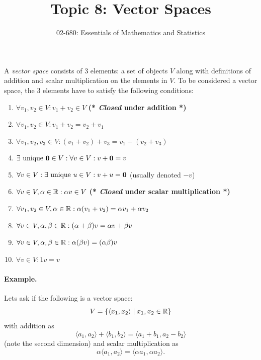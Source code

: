 


\title{Topic 8: Vector Spaces}
\author{02-680: Essentials of Mathematics and Statistics}


\maketitle

A \emph{vector space} consists of 3 elements: 
a set of objects $V$ along with definitions of addition and scalar multiplication on the elements in $V$. 
To be considered a vector space, the 3 elements have to satisfy the following conditions: 
\begin{enumerate}
\item $\forall v_1,v_2 \in V : v_1+v_2 \in V$ \textbf{(* \emph{Closed} under addition *)}
\item $\forall v_1,v_2 \in V : v_1 + v_2 = v_2 + v_1$
\item $\forall v_1,v_2,v_3 \in V : (v_1 + v_2) + v_3 = v_1 + (v_2 + v_3)$
\item $\exists \textnormal{ unique }\mathbf{0} \in V : \forall v \in V : v + \mathbf{0} = v$ 
\item $\forall v \in V : \exists \textnormal{ unique }u \in V : v + u = \mathbf{0}$ (usually denoted $-v$)
\item $\forall v\in V, \alpha \in \operatorname{\mathbb{R}}: \alpha v \in V$ \textbf{(* \emph{Closed} under scalar multiplication *)}
\item $\forall v_1,v_2\in V, \alpha \in \operatorname{\mathbb{R}}: \alpha (v_1 + v_2) = \alpha v_1 + \alpha v_2$
\item $\forall v \in V, \alpha,\beta \in \operatorname{\mathbb{R}}: (\alpha+\beta) v = \alpha v + \beta v$
\item $\forall v \in V, \alpha,\beta \in \operatorname{\mathbb{R}}: \alpha(\beta v) = (\alpha\beta) v$
\item$\forall v \in V : 1v = v$ 
\end{enumerate} 

\paragraph{Example.} 
Lets ask if the following is a vector space: 
\[V = \left\{\left\langle x_1, x_2\right\rangle \mid x_1,x_2 \in \operatorname{\mathbb{R}} \right\}\]
with addition as 
\[ \langle a_1,a_2\rangle + \langle b_1, b_2\rangle = \langle a_1+b_1, a_2-b_2\rangle\]
(note the second dimension)
and scalar multiplication as 
\[\alpha \langle a_1,a_2\rangle = \langle \alpha a_1, \alpha a_2\rangle.\]

